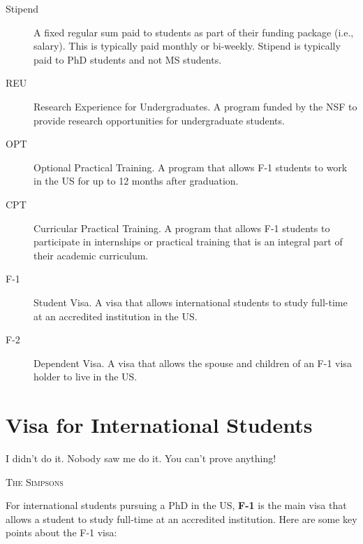 \documentclass[oneside,11pt,dvipsnames]{book}
\begin{document}
\begin{description}
        \item [Stipend] A fixed regular sum paid to students as part of their funding package (i.e., salary). This is typically paid monthly or bi-weekly.  Stipend is typically paid to PhD students and not MS students.
  \item[REU] Research Experience for Undergraduates. A program funded by the NSF to provide research opportunities for undergraduate students.
    \item[OPT] Optional Practical Training. A program that allows F-1 students to work in the US for up to 12 months after graduation.
  \item[CPT] Curricular Practical Training. A program that allows F-1 students to participate in internships or practical training that is an integral part of their academic curriculum.
  \item[F-1] Student Visa. A visa that allows international students to study full-time at an accredited institution in the US.
  \item[F-2] Dependent Visa. A visa that allows the spouse and children of an F-1 visa holder to live in the US.
\end{description}

\chapter{Visa for International Students}\label{sec:visa}

\epigraph{\vspace{-0.2in} I didn’t do it. Nobody saw me do it. You can’t prove anything!}{\textsc{The Simpsons}}



For international students pursuing a PhD in the US, \textbf{F-1} is the main visa that allows a student to study full-time at an accredited institution.  Here are some key points about the F-1 visa:
\end{document}
